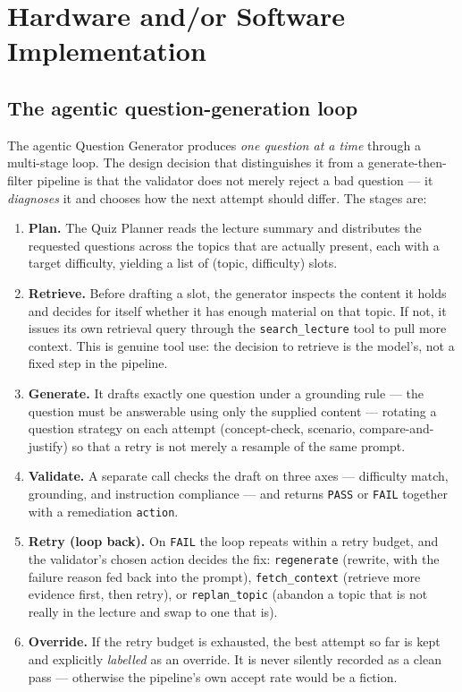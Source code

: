 \section{Hardware and/or Software Implementation}
\label{sec:meth-impl}

\subsection{The agentic question-generation loop}
\label{sec:meth-agentic}

The agentic Question Generator produces \emph{one question at a time} through a
multi-stage loop. The design decision that distinguishes it from a
generate-then-filter pipeline is that the validator does not merely reject a bad
question --- it \emph{diagnoses} it and chooses how the next attempt should differ.
The stages are:

\begin{enumerate}
  \item \textbf{Plan.} The Quiz Planner reads the lecture summary and distributes
        the requested questions across the topics that are actually present, each
        with a target difficulty, yielding a list of (topic, difficulty) slots.
  \item \textbf{Retrieve.} Before drafting a slot, the generator inspects the content
        it holds and decides for itself whether it has enough material on that topic.
        If not, it issues its own retrieval query through the
        \texttt{search\_lecture} tool to pull more context. This is genuine tool use:
        the decision to retrieve is the model's, not a fixed step in the pipeline.
  \item \textbf{Generate.} It drafts exactly one question under a grounding rule ---
        the question must be answerable using only the supplied content --- rotating
        a question strategy on each attempt (concept-check, scenario,
        compare-and-justify) so that a retry is not merely a resample of the same
        prompt.
  \item \textbf{Validate.} A separate call checks the draft on three axes ---
        difficulty match, grounding, and instruction compliance --- and returns
        \texttt{PASS} or \texttt{FAIL} together with a remediation \texttt{action}.
  \item \textbf{Retry (loop back).} On \texttt{FAIL} the loop repeats within a retry
        budget, and the validator's chosen action decides the fix:
        \texttt{regenerate} (rewrite, with the failure reason fed back into the
        prompt), \texttt{fetch\_context} (retrieve more evidence first, then retry),
        or \texttt{replan\_topic} (abandon a topic that is not really in the lecture
        and swap to one that is).
  \item \textbf{Override.} If the retry budget is exhausted, the best attempt so far
        is kept and explicitly \emph{labelled} as an override. It is never silently
        recorded as a clean pass --- otherwise the pipeline's own accept rate would
        be a fiction.
\end{enumerate}

